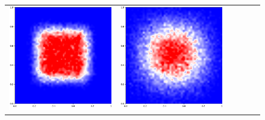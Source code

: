\documentclass[12pt, reqno]{report}
\theoremstyle{definition}
\theoremstyle{remark}
\begin{document}
\begin{figure}[H]
\begin{tabular}{rccccc}
        \includegraphics[align = c, height=\subheight]{media_paper/cmap_MD_n=200.png} & 
        \includegraphics[align = c, height=\subheight]{media_paper/cmap_MD_n=500.png} & 

\end{tabular}
\end{figure}
\end{document}
